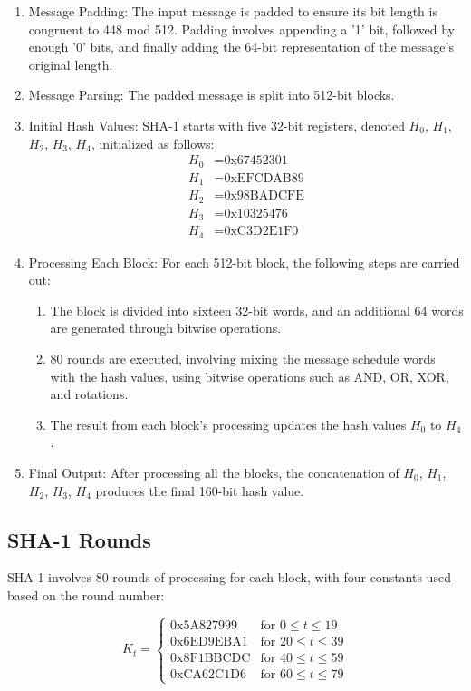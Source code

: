 \documentclass{article}
\begin{document}
\begin{enumerate}
    \item Message Padding: The input message is padded to ensure its bit length is congruent to 448 mod 512. Padding involves appending a '1' bit, followed by enough '0' bits, and finally adding the 64-bit representation of the message's original length.
    \item Message Parsing: The padded message is split into 512-bit blocks.
    \item Initial Hash Values: SHA-1 starts with five 32-bit registers, denoted $H_0$, $H_1$, $H_2$, $H_3$, $H_4$, initialized as follows:
    \begin{align*}
        H_0 &= \text{0x67452301} \\
        H_1 &= \text{0xEFCDAB89} \\
        H_2 &= \text{0x98BADCFE} \\
        H_3 &= \text{0x10325476} \\
        H_4 &= \text{0xC3D2E1F0}
    \end{align*}
    \item Processing Each Block: For each 512-bit block, the following steps are carried out:
    \begin{enumerate}
        \item The block is divided into sixteen 32-bit words, and an additional 64 words are generated through bitwise operations.
        \item 80 rounds are executed, involving mixing the message schedule words with the hash values, using bitwise operations such as AND, OR, XOR, and rotations.
        \item The result from each block's processing updates the hash values $H_0$ to $H_4$.
    \end{enumerate}
    \item Final Output: After processing all the blocks, the concatenation of $H_0$, $H_1$, $H_2$, $H_3$, $H_4$ produces the final 160-bit hash value.
\end{enumerate}

\subsection{SHA-1 Rounds}

SHA-1 involves 80 rounds of processing for each block, with four constants used based on the round number:

\[
K_t =
\begin{cases}
    \text{0x5A827999} & \text{for } 0 \leq t \leq 19 \\
    \text{0x6ED9EBA1} & \text{for } 20 \leq t \leq 39 \\
    \text{0x8F1BBCDC} & \text{for } 40 \leq t \leq 59 \\
    \text{0xCA62C1D6} & \text{for } 60 \leq t \leq 79
\end{cases}
\]
\end{document}
